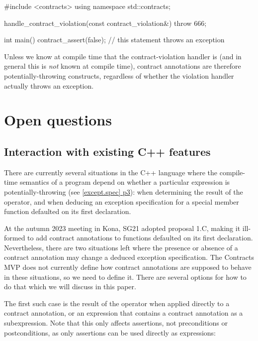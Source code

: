 \begin{codeblock}
#include <contracts>
using namespace std::contracts;

handle_contract_violation(const contract_violation&) {
  throw 666;
}

int main() {
  contract_assert(false);  // this statement throws an exception
}
\end{codeblock}

Unless we know at compile time that the contract-violation handler is  (and in general this is \emph{not} known at compile time), contract annotations are therefore potentially-throwing constructs, regardless of whether the violation handler actually throws an exception.

\section{Open questions}
\subsection{Interaction with existing C++ features}

There are currently several situations in the C++ language where the compile-time semantics of a program depend on whether a particular expression is potentially-throwing (see \href{https://eel.is/c++draft/except.spec#3}{[except.spec] p3}): when determining the result of the  operator, and when deducing an exception specification for a special member function defaulted on its first declaration.

At the autumn 2023 meeting in Kona, SG21 adopted \cite{P2932R2} proposal 1.C, making it ill-formed to add contract annotations to functions defaulted on its first declaration. Nevertheless, there are two situations left where the presence or absence of a contract annotation may change a deduced exception specification. The Contracts MVP does not currently define how contract annotations are supposed to behave in these situations, so we need to define it. There are several options for how to do that which we will discuss in this paper.


The first such case is the result of the  operator when applied directly to a contract annotation, or an expression that contains a contract annotation as a subexpression. Note that this only affects assertions, not preconditions or postconditions, as only assertions can be used directly as expressions:

